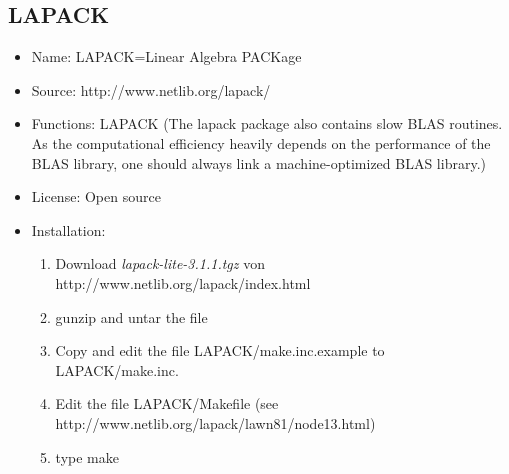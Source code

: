 \documentclass[a4paper,10pt]{report}
\begin{document}
\subsection{LAPACK}
\begin{itemize}
\item Name: LAPACK=Linear Algebra PACKage
\item Source: http://www.netlib.org/lapack/
\item Functions: LAPACK (The lapack package also contains slow BLAS
  routines. As the computational efficiency heavily depends on the
  performance of the BLAS library, one should always link a
  machine-optimized BLAS library.)
\item License: Open source
\item Installation:
\begin{enumerate}
\item Download \textit{lapack-lite-3.1.1.tgz} von
http://www.netlib.org/lapack/index.html
\item gunzip and untar the file
\item Copy and edit the file LAPACK/make.inc.example to LAPACK/make.inc.
\item Edit the file LAPACK/Makefile (see
http://www.netlib.org/lapack/lawn81/node13.html)
\item type make
\end{enumerate}
\end{itemize}

\end{document}
